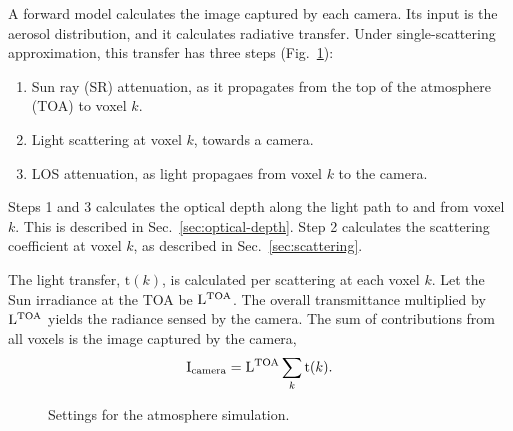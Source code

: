 \documentclass[10pt,twocolumn,letterpaper]{article}
\begin{document}
A forward model calculates the image captured by each camera.
Its input is the aerosol distribution, and it calculates radiative
transfer. Under single-scattering approximation, this transfer has three steps (Fig.~\ref{fig:settings}):
\begin{enumerate}
\item Sun ray (SR) attenuation, as it propagates from the top of the atmosphere
  (TOA) to voxel $k$.
\item Light scattering at voxel $k$, towards a camera.
\item LOS attenuation, as light propagaes from voxel $k$ to the camera.
\end{enumerate}
Steps 1 and 3 calculates the optical depth
along the light path to and from voxel $k$. This is described in Sec.~\ref{sec:optical-depth}.
Step 2 calculates the scattering coefficient at voxel $k$,
as described in Sec.~\ref{sec:scattering}.

The light transfer, $\mathrm{t}(k)$, is calculated per scattering at
each voxel $k$.  Let the Sun irradiance at the TOA be $\mathrm{L}^{\rm
  TOA}$.  The overall transmittance multiplied by $\mathrm{L}^{\rm
  TOA}$ yields the radiance sensed by the camera. The sum of
contributions from all voxels is the image captured by the camera,
\begin{align}
  \mathrm{I}_{\rm camera}=\mathrm{L}^{\rm TOA} \sum_k \mathrm{t}(k).
  \label{eq:transatsensor}
\end{align}

\begin{figure}
  \centering {}
  
  \caption[Settings of the atmosphere simulation]{Settings for the
    atmosphere simulation.}
  \label{fig:settings}
\end{figure}
\end{document}
